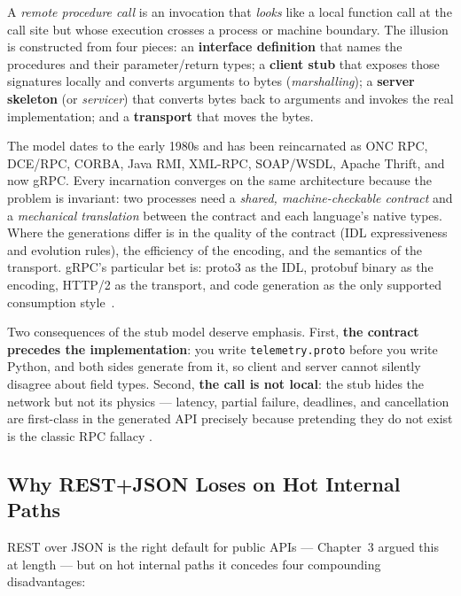\begin{definition}
A \emph{remote procedure call} is an invocation that \emph{looks} like a local
function call at the call site but whose execution crosses a process or machine
boundary. The illusion is constructed from four pieces: an \textbf{interface
definition} that names the procedures and their parameter/return types; a
\textbf{client stub} that exposes those signatures locally and converts
arguments to bytes (\emph{marshalling}); a \textbf{server skeleton} (or
\emph{servicer}) that converts bytes back to arguments and invokes the real
implementation; and a \textbf{transport} that moves the bytes.
\end{definition}

The model dates to the early 1980s and has been reincarnated as ONC RPC, DCE/RPC,
CORBA, Java RMI, XML-RPC, SOAP/WSDL, Apache Thrift, and now gRPC. Every
incarnation converges on the same architecture because the problem is invariant:
two processes need a \emph{shared, machine-checkable contract} and a
\emph{mechanical translation} between the contract and each language's native
types. Where the generations differ is in the quality of the contract (IDL
expressiveness and evolution rules), the efficiency of the encoding, and the
semantics of the transport. gRPC's particular bet is: proto3 as the IDL,
protobuf binary as the encoding, HTTP/2 as the transport, and code generation as
the only supported consumption style~\cite{grpcdocs,protobufdocs}.

Two consequences of the stub model deserve emphasis. First, \textbf{the contract
precedes the implementation}: you write \texttt{telemetry.proto} before you
write Python, and both sides generate from it, so client and server cannot
silently disagree about field types. Second, \textbf{the call is not local}: the
stub hides the network but not its physics --- latency, partial failure,
deadlines, and cancellation are first-class in the generated API precisely
because pretending they do not exist is the classic RPC fallacy
\cite{kleppmann2017ddia,newman2021microservices}.

\subsection{Why REST+JSON Loses on Hot Internal Paths}
\label{subsec:ch13-why-not-rest}

REST over JSON is the right default for public APIs --- Chapter~3 argued this at
length --- but on hot internal paths it concedes four compounding
disadvantages:

